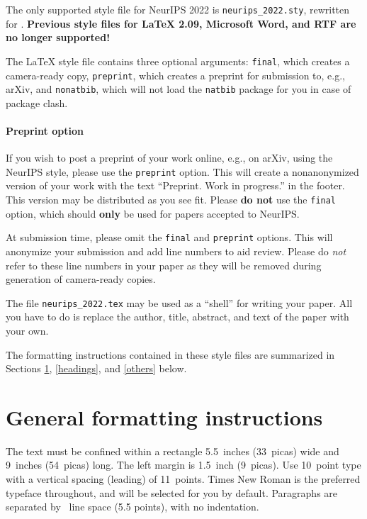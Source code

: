 \documentclass{article}
\begin{document}
The only supported style file for NeurIPS 2022 is \verb+neurips_2022.sty+,
rewritten for \LaTeXe{}. \textbf{Previous style files for \LaTeX{} 2.09,
      Microsoft Word, and RTF are no longer supported!}

The \LaTeX{} style file contains three optional arguments: \verb+final+, which
creates a camera-ready copy, \verb+preprint+, which creates a preprint for
submission to, e.g., arXiv, and \verb+nonatbib+, which will not load the
\verb+natbib+ package for you in case of package clash.

\paragraph{Preprint option}
If you wish to post a preprint of your work online, e.g., on arXiv, using the
NeurIPS style, please use the \verb+preprint+ option. This will create a
nonanonymized version of your work with the text ``Preprint. Work in
progress.'' in the footer. This version may be distributed as you see fit.
Please \textbf{do not} use the \verb+final+ option, which should \textbf{only}
be used for papers accepted to NeurIPS.

At submission time, please omit the \verb+final+ and \verb+preprint+ options.
This will anonymize your submission and add line numbers to aid review. Please
do \emph{not} refer to these line numbers in your paper as they will be removed
during generation of camera-ready copies.

The file \verb+neurips_2022.tex+ may be used as a ``shell'' for writing your
paper. All you have to do is replace the author, title, abstract, and text of
the paper with your own.

The formatting instructions contained in these style files are summarized in
Sections \ref{gen_inst}, \ref{headings}, and \ref{others} below.

\section{General formatting instructions}
\label{gen_inst}

The text must be confined within a rectangle 5.5~inches (33~picas) wide and
9~inches (54~picas) long. The left margin is 1.5~inch (9~picas). Use 10~point
type with a vertical spacing (leading) of 11~points. Times New Roman is the
preferred typeface throughout, and will be selected for you by default.
Paragraphs are separated by ~line space (5.5 points), with no
indentation.
\end{document}
